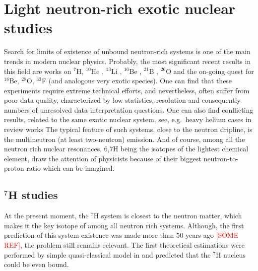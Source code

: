\section{Light neutron-rich exotic nuclear studies}

Search for limits of existence of unbound neutron-rich systems is one of the main trends in modern nuclear physics.
Probably, the most significant recent results in this field are works on $^{7}$H, $^{10}$He \cite{Sidorchuk:2012,Kohley:2012,Jones:2015,Matta:2015}, $^{13}$Li \cite{Johansson:2010a,Kohley:2013b}, $^{16}$Be \cite{Spyrou:2012}, $^{21}$B \cite{Leblond:2018}, $^{26}$O \cite{Kohley:2013,Caesar:2013,Kondo:2016} and the on-going quest for $^{18}$Be, $^{28}$O, $^{33}$F \cite{Ahn:2019} (and analogous very exotic species). 
One can find that these experiments require extreme technical efforts, and nevertheless, often suffer from poor data quality, characterized by low statistics, resolution and consequently numbers of unresolved data interpretation questions.
One can also find conflicting results, related to the same exotic nuclear system, see, e.g.\ heavy helium cases in review works \cite{Grigorenko:2016,Fortune:2018}
The typical feature of such systems, close to the neutron dripline, is the multineutron (at least two-neutron) emission.
And of course, among all the neutron rich nuclear resonances, 6,7H being the isotopes of the lightest chemical element, draw the attention of physicists because of their biggest neutron-to-proton ratio which can be imagined.

\subsection{$^{7}$H studies}

At the present moment, the $^{7}$H system is closest to the neutron matter, which makes it the key isotope of among all neutron rich systems. 
Although, the first prediction of this system existence was made more than 50 years ago \textcolor{red}{[SOME REF]}, the problem still remains relevant.
The first theoretical estimations were performed by simple quasi-classical model in \cite{Baz:1972} and predicted that the $^{7}$H nucleus could be even bound.

